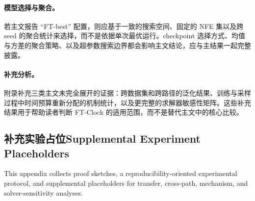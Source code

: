 \paragraph{模型选择与聚合。}
若主文报告 ``FT-best'' 配置，则应基于一致的搜索空间、固定的 NFE 集以及跨 seed 的聚合统计来选择，而不是依据单次最优运行。checkpoint 选择方式、均值与方差的聚合策略、以及超参数搜索边界都会影响主文结论，应与主结果一起完整披露。

\paragraph{补充分析。}
附录补充三类主文未完全展开的证据：跨数据集和跨路径的泛化结果、训练与采样过程中时间预算重新分配的机制统计，以及更完整的求解器敏感性矩阵。这些补充结果用于帮助读者判断 FT-Clock 的适用范围，而不是替代主文中的核心比较。

\subsection{\ifinternalcn 补充实验占位\else Supplemental Experiment Placeholders\fi}





\else
This appendix collects proof sketches, a reproducibility-oriented experimental protocol, and supplemental placeholders for transfer, cross-path, mechanism, and solver-sensitivity analyses.
\fi
